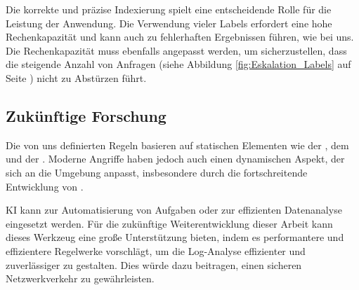 Die korrekte und präzise Indexierung spielt eine entscheidende Rolle für die Leistung der Anwendung. Die Verwendung vieler Labels erfordert eine hohe Rechenkapazität und kann auch zu fehlerhaften Ergebnissen führen, wie bei uns. Die Rechenkapazität muss ebenfalls angepasst werden, um sicherzustellen, dass die steigende Anzahl von Anfragen (siehe Abbildung \ref{fig:Eskalation_Labels} auf Seite \pageref{fig:Eskalation_Labels}) nicht zu Abstürzen führt.

\subsection{Zukünftige Forschung}


Die von uns definierten Regeln basieren auf statischen Elementen wie der , dem  und der . Moderne Angriffe haben jedoch auch einen dynamischen Aspekt, der sich an die Umgebung anpasst, insbesondere durch die fortschreitende Entwicklung von  \citep{Guembe_AIHACKER}.

\gls{KI} kann zur Automatisierung von Aufgaben oder zur effizienten Datenanalyse eingesetzt werden. Für die zukünftige Weiterentwicklung dieser Arbeit kann dieses Werkzeug eine große Unterstützung bieten, indem es performantere und effizientere Regelwerke vorschlägt, um die Log-Analyse effizienter und zuverlässiger zu gestalten. Dies würde dazu beitragen, einen sicheren Netzwerkverkehr zu gewährleisten.







